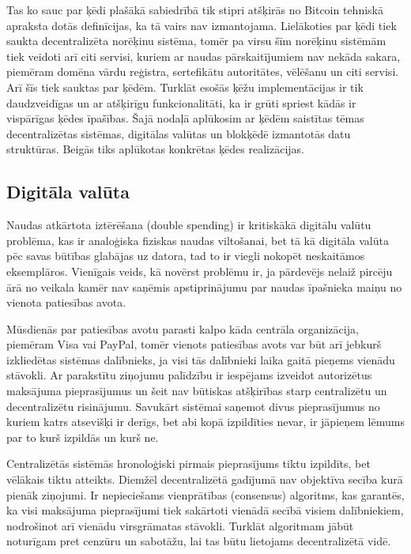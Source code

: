 Tas ko sauc par ķēdi plašākā sabiedrībā tik stipri atšķirās no Bitcoin tehniskā apraksta\cite{nakamoto08} dotās definīcijas, ka tā vairs nav izmantojama. 
Lielākoties par ķēdi tiek saukta decentralizēta norēķinu sistēma, tomēr pa virsu šīm norēķinu sistēmām tiek veidoti arī citi servisi, kuriem ar naudas pārskaitījumiem nav nekāda sakara, piemēram domēna vārdu reģistra, sertefikātu autoritātes, vēlēšanu un citi servisi.\cite{namecoin} Arī šīs tiek sauktas par ķēdēm.
Turklāt esošās ķēžu implementācijas ir tik daudzveidīgas un ar atšķirīgu funkcionalitāti, ka ir grūti spriest kādās ir vispārīgas ķēdes īpašības.
Šajā nodaļā aplūkosim ar ķēdēm saistītas tēmas \textemdash{} decentralizētas sistēmas, digitālas valūtas un blokķēdē izmantotās datu struktūras. Beigās tiks aplūkotas konkrētas ķēdes realizācijas.

\subsection{Digitāla valūta}
Naudas atkārtota iztērēšana (double spending) ir kritiskākā digitālu valūtu problēma, kas ir analoģiska fiziskas naudas viltošanai, bet tā kā digitāla valūta pēc savas būtības glabājas uz datora, tad to ir viegli nokopēt neskaitāmos eksemplāros. Vienīgais veids, kā novērst problēmu ir, ja pārdevējs nelaiž pircēju ārā no veikala kamēr nav saņēmis apstiprinājumu par naudas īpašnieka maiņu no vienota patiesības avota.\cite{frankel96}

Mūsdienās par patiesības avotu parasti kalpo kāda centrāla organizācija, piemēram Visa vai PayPal, tomēr vienots patiesības avots var būt arī jebkurš izkliedētas sistēmas dalībnieks, ja visi tās dalībnieki laika gaitā pieņems vienādu stāvokli.
Ar parakstītu ziņojumu palīdzību ir iespējams izveidot autorizētus maksājuma pieprasījumus un šeit nav būtiskas atšķirības starp centralizētu un decentralizētu risinājumu. Savukārt sistēmai saņemot divus pieprasījumus no kuriem katrs atsevišķi ir derīgs, bet abi kopā izpildīties nevar, ir jāpieņem lēmums par to kurš izpildās un kurš ne.

Centralizētās sistēmās hronoloģiski pirmais pieprasījums tiktu izpildīts, bet vēlākais tiktu atteikts. Diemžēl decentralizētā gadījumā nav objektīva secība kurā pienāk ziņojumi. Ir nepieciešams vienprātības (consensus) algoritms, kas garantēs, ka visi maksājuma pieprasījumi tiek sakārtoti vienādā secībā visiem dalībniekiem, nodrošinot arī vienādu virsgrāmatas stāvokli.
Turklāt algoritmam jābūt noturīgam pret cenzūru un sabotāžu, lai tas būtu lietojams decentralizētā vidē.

